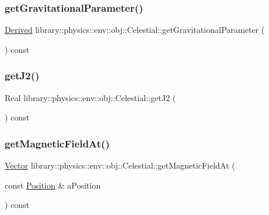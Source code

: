 \subsubsection{\texorpdfstring{get\+Gravitational\+Parameter()}{getGravitationalParameter()}}
{\footnotesize\ttfamily \hyperlink{classlibrary_1_1physics_1_1units_1_1_derived}{Derived} library\+::physics\+::env\+::obj\+::\+Celestial\+::get\+Gravitational\+Parameter (\begin{DoxyParamCaption}{ }\end{DoxyParamCaption}) const}

\mbox{\label{classlibrary_1_1physics_1_1env_1_1obj_1_1_celestial_a3740b398dca520bd50862f67c29ab8e7}} 
\subsubsection{\texorpdfstring{get\+J2()}{getJ2()}}
{\footnotesize\ttfamily Real library\+::physics\+::env\+::obj\+::\+Celestial\+::get\+J2 (\begin{DoxyParamCaption}{ }\end{DoxyParamCaption}) const}

\mbox{\label{classlibrary_1_1physics_1_1env_1_1obj_1_1_celestial_a45b9b74291b42d8ec6421eb4d3e7c7f0}} 
\subsubsection{\texorpdfstring{get\+Magnetic\+Field\+At()}{getMagneticFieldAt()}}
{\footnotesize\ttfamily \hyperlink{classlibrary_1_1physics_1_1data_1_1_vector}{Vector} library\+::physics\+::env\+::obj\+::\+Celestial\+::get\+Magnetic\+Field\+At (\begin{DoxyParamCaption}\item[{const \hyperlink{classlibrary_1_1physics_1_1coord_1_1_position}{Position} \&}]{a\+Position }\end{DoxyParamCaption}) const}

